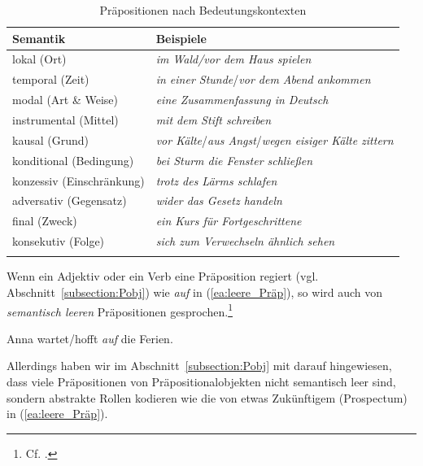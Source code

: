 \begin{table}
  \centering
  \begin{tabular}{l l}
    \lsptoprule
    Semantik & Beispiele \\
    \hline
    lokal (Ort) & \textit{im Wald/vor dem Haus spielen}\\
    
    temporal (Zeit) & \textit{in einer Stunde}/\textit{vor dem Abend ankommen}\\
    
    modal (Art \& Weise) & \textit{eine Zusammenfassung in Deutsch} \\
    
    instrumental (Mittel) &  \textit{mit dem Stift schreiben}\\ 
    
    kausal (Grund) &  \textit{vor Kälte}/\textit{aus Angst}/\textit{wegen eisiger Kälte zittern}\\
    
    konditional (Bedingung) & \textit{bei Sturm die Fenster schließen}\\
    
    konzessiv (Einschränkung) &  \textit{trotz des Lärms schlafen}\\
    
    adversativ (Gegensatz) & \textit{wider das Gesetz handeln}\\
    
    final (Zweck) & \textit{ein Kurs für Fortgeschrittene}\\ 
    
    konsekutiv (Folge) & \textit{sich zum Verwechseln ähnlich sehen}\\
    
    \lspbottomrule 
  \end{tabular}
  \caption{Präpositionen nach Bedeutungskontexten}
  \label{tab:Präp_Semantik}
\end{table}

Wenn ein Adjektiv oder ein Verb eine Präposition regiert (vgl. Abschnitt~\ref{subsection:Pobj}) wie \textit{auf} in (\ref{ea:leere_Präp}), so wird auch von \textit{semantisch leeren} Präpositionen gesprochen.\footnote{Cf. \citet[812, §1432]{Duden2022}.}

\ea \label{ea:leere_Präp} Anna wartet/hofft \textit{auf} die Ferien.
\z 

Allerdings haben wir im Abschnitt~\ref{subsection:Pobj} mit \citet[287]{Hoellein2019} darauf hingewiesen, dass viele Präpositionen von Präpositionalobjekten nicht semantisch leer sind, sondern abstrakte Rollen kodieren wie die von etwas Zukünftigem (Prospectum) in (\ref{ea:leere_Präp}).

